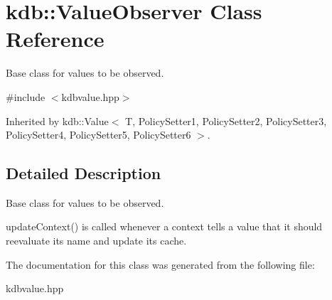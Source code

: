 \hypertarget{classkdb_1_1ValueObserver}{\section{kdb\-:\-:Value\-Observer Class Reference}
\label{classkdb_1_1ValueObserver}
}


Base class for values to be observed.  




{\ttfamily \#include $<$kdbvalue.\-hpp$>$}



Inherited by kdb\-::\-Value$<$ T, Policy\-Setter1, Policy\-Setter2, Policy\-Setter3, Policy\-Setter4, Policy\-Setter5, Policy\-Setter6 $>$.



\subsection{Detailed Description}
Base class for values to be observed. 

update\-Context() is called whenever a context tells a value that it should reevaluate its name and update its cache. 

The documentation for this class was generated from the following file\-:\begin{DoxyCompactItemize}
\item 
kdbvalue.\-hpp\end{DoxyCompactItemize}
